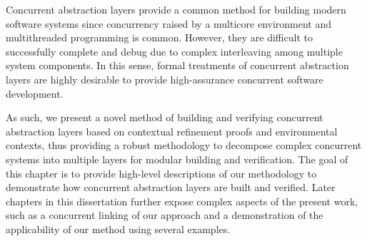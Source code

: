 Concurrent abstraction layers provide a common method for building modern software systems since concurrency raised by a multicore environment and multithreaded programming is common. 
However, they are difficult to successfully complete and debug due to complex interleaving among multiple system components. 
In this sense, formal treatments of concurrent abstraction layers are highly desirable to provide high-assurance concurrent software development.

As such, we present a novel method of building and verifying concurrent abstraction layers based 
on contextual refinement proofs and environmental contexts, thus providing a robust methodology to decompose complex concurrent systems into multiple layers for modular building and verification. 
The goal of this chapter is to provide high-level descriptions of our methodology to demonstrate how concurrent abstraction layers are built and verified. Later chapters in this dissertation further expose complex aspects of the present work, 
such as a concurrent linking of our approach and a demonstration of the applicability of our method using several examples.

